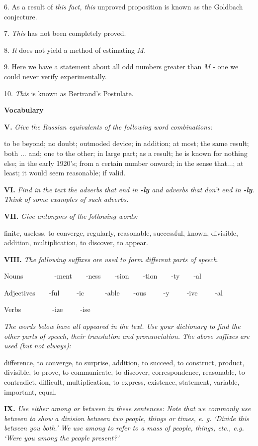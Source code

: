 \documentclass[a4paper]{article}
\newcommand{\ESect}[1]{\medskip\par{\large \textbf{#1}}\par}
\newcommand{\ETask}[2]{\medskip\par\textbf{#1.} \textit{#2}\par}
\newcommand{\ETypeWr}[1]{\par\begin{ttfamily}#1\end{ttfamily}\par}
\begin{document}
6. As a result of \textit{this fact, this} unproved proposition is known as the Goldbach conjecture.

7. \textit{This} has not been completely proved.

8. \textit{It} does not yield a method of estimating $M$.

9. Here we have a statement about all odd numbers greater than $M$ - one we could never verify experimentally.

10. \textit{This} is known as Bertrand's Postulate.

\ESect{Vocabulary}

\ETask{V}{Give the Russian equivalents of the following word combinations:}

to be beyond; no doubt; outmoded device; in addition; at most; the same result; both ... and; one to the other; in large part;
as a result; he is known for nothing else; in the early 1920's; from a certain number onward; in the sense that...; at least;
it would seem reasonable; if valid.

\ETask{VI}{Find in the text the adverbs that end in \textbf{-ly} and adverbs that don't end in \textbf{-ly}. Think of some
examples of such adverbs.}

\ETask{VII}{Give antonyms of the following words:}
finite, useless, to converge, regularly, reasonable, successful, known, divisible, addition, multiplication, to discover, to appear.

\ETask{VIII}{The following suffixes are used to form different parts of speech.}
\ETypeWr{
Nouns~~~~~~~~~-ment~~~~-ness~~~~-sion~~~~-tion~~~~-ty~~~~-al

Adjectives~~~~-ful~~~~~-ic~~~~~~-able~~~~-ous~~~~~-y~~~~~-ive~~~~~-al

Verbs~~~~~~~~~-ize~~~~~-ise}

\textit{The words below have all appeared in the text. Use your dictionary to find the other parts of speech, their translation and
pronunciation. The above suffixes are used (but not always):}

\sloppy
difference, to converge, to surprise, addition, to succeed, to construct, product, divisible, to prove, to communicate,
to discover, correspondence, reasonable, to contradict, difficult, multiplication, to express, existence, statement, variable,
important, equal.

\fussy
\ETask{IX}{Use either among or between in these sentences: Note that we commonly use between to show a division between two
people, things or times, e. g. `Divide this between you both.' We use among to refer to a mass of people, things, etc., e.g.
`Were you among the people present?'}
\end{document}
